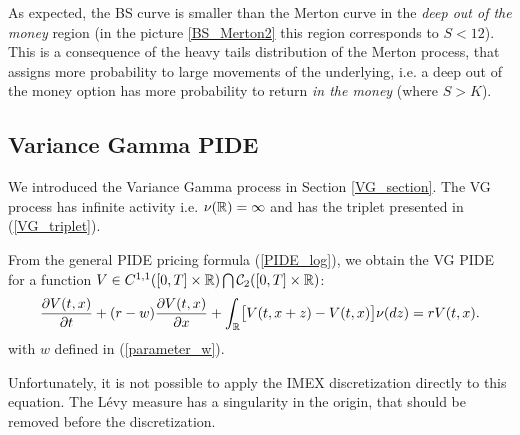 As expected, the BS curve is smaller than the Merton curve in the \emph{deep out of the money} region (in the picture \ref{BS_Merton2} this region corresponds to $S<12$). 
This is a consequence of the heavy tails distribution of the Merton process, that assigns more probability to large movements of the underlying, i.e. a deep out of the money
option has more probability to return \emph{in the money} (where $S>K$).


\subsection{Variance Gamma PIDE}\label{VG_section2}

We introduced the Variance Gamma process in Section \ref{VG_section}. The VG process has infinite activity i.e.
$\nu(\mathbb{R}) = \infty$ and has the triplet presented in (\ref{VG_triplet}). 
 
From the general PIDE pricing formula (\ref{PIDE_log}), we obtain the VG PIDE for a function $V \in C^{1,1}([0,T] \times \mathbb{R}) \bigcap \mathcal{C}_2([0,T] \times \mathbb{R})$:
\begin{equation} \label{VG_PIDE}
 \frac{\partial V(t,x)}{\partial t} + (r-w) \frac{\partial V(t,x)}{\partial x}
 + \int_{\mathbb{R}} \bigl[ V(t,x+z) - V(t,x) \bigr] \nu(dz) = rV(t,x) .
\end{equation}
with $w$ defined in (\ref{parameter_w}).

Unfortunately, it is not possible to apply the IMEX discretization directly to this equation. The Lévy measure has a singularity in the origin,
that should be removed before the discretization.


